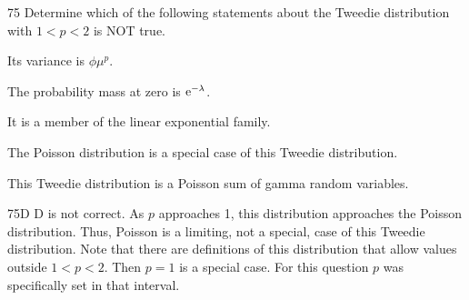 \begin{question}{75}
Determine which of the following statements about the Tweedie distribution with $1 < p < 2$ is NOT true.

\begin{choices}
\item Its variance is $\phi \mu^p$.
\item The probability mass at zero is $\mathrm{e}^{-\lambda}$.
\item It is a member of the linear exponential family.
\item The Poisson distribution is a special case of this Tweedie distribution.
\item This Tweedie distribution is a Poisson sum of gamma random variables.
\end{choices}
\end{question}
\begin{solution}{75}{D}
D is not correct. As $p$ approaches 1, this distribution approaches the Poisson distribution. Thus, Poisson is a limiting, not a special, case of this Tweedie distribution. Note that there are definitions of this distribution that allow values outside $1 < p < 2$. Then $p = 1$ is a special case. For this question $p$ was specifically set in that interval.
\end{solution}
